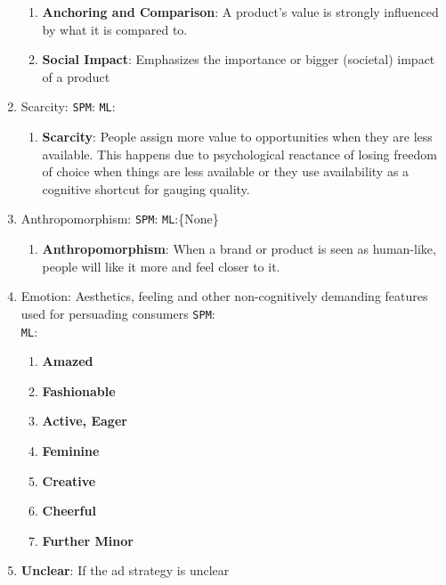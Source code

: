 \documentclass[hidelinks,11pt,a4paper]{report}
\renewcommand{\cite}[1]{\citep{#1}}
\begin{document}
\begin{enumerate}
\begin{enumerate}
        \item \textbf{Anchoring and Comparison}: A product's value is strongly influenced by what it is compared to.

        \item \textbf{Social Impact}: Emphasizes the importance or bigger (societal) impact of a product 
    \end{enumerate}

    \item Scarcity: \texttt{SPM}: \cite{brehm1966theory,lynn1991scarcity,rothman1999systematic,tversky1985framing} \texttt{ML}:\cite{yang2019let,ChenYang2021,shaikh-etal-2020-examining}
    \begin{enumerate}
        \item \textbf{Scarcity}: People assign more value to opportunities when they are less available. This happens due to psychological reactance of losing freedom of choice when things are less available or they use availability as a cognitive shortcut for gauging quality. 
    \end{enumerate}

    \item Anthropomorphism: \texttt{SPM}:\cite{fournier1998consumers,levesque2020human,epley2007seeing} \texttt{ML}:\{None\}
    \begin{enumerate}
        \item \textbf{Anthropomorphism}: When a brand or product is seen as human-like, people will like it more and feel closer to it.
    \end{enumerate}

    \item Emotion: Aesthetics, feeling and other non-cognitively demanding features used for persuading consumers \texttt{SPM}:\cite{hibbert2007guilt,petty1986elaboration,petty1983central}\\\texttt{ML}:\cite{yang2019let,tan2016winning,hidey2017analyzing,he2018decoupling,durmus-cardie-2018-exploring,zhang2017characterizing,wachsmuth2017computational}
    \begin{enumerate}
        \item \textbf{Amazed}
        \item \textbf{Fashionable}
        \item \textbf{Active, Eager}
        \item \textbf{Feminine}
        \item \textbf{Creative}
        \item \textbf{Cheerful}
        \item \textbf{Further Minor}
    \end{enumerate}

    \item \textbf{Unclear}: If the ad strategy is unclear     
\end{enumerate}
\end{document}
